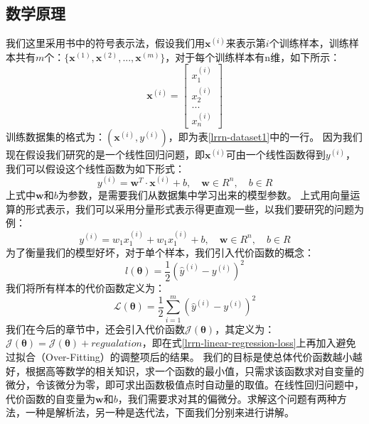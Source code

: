 \documentclass[UTF8]{article}
\begin{document}
\subsection{数学原理}
我们这里采用\cite{dl-tf-theano}书中的符号表示法，假设我们用$\boldsymbol{x}^{(i)}$来表示第$i$个训练样本，训练样本共有$m$个：$\{ \boldsymbol{x}^{(1)}, \boldsymbol{x}^{(2)}, ..., \boldsymbol{x}^{(m)} \}$，对于每个训练样本有n维，如下所示：
\begin{equation}
\boldsymbol{x}^{(i)} = \begin{bmatrix}
x_{1}^{(i)} \\
x_{2}^{(i)} \\
... \\
x_{n}^{(i)}
\end{bmatrix}
\label{lrrn-x-def}
\end{equation}
训练数据集的格式为：$(\boldsymbol{x}^{(i)}, y^{(i)})$，即为表\ref{lrrn-dataset1}中的一行。\newline
因为我们现在假设我们研究的是一个线性回归问题，即$\boldsymbol{x}^{(i)}$可由一个线性函数得到$y^{(i)}$，我们可以假设这个线性函数为如下形式：
\begin{equation}
y^{(i)} = \boldsymbol{w}^{T} \cdot \boldsymbol{x}^{(i)} + b, \quad \boldsymbol{w} \in R^{n}, \quad b \in R
\label{lrrn-linear-function-def}
\end{equation}
上式中$\boldsymbol{w}$和$b$为参数，是需要我们从数据集中学习出来的模型参数。\newline
上式用向量运算的形式表示，我们可以采用分量形式表示得更直观一些，以我们要研究的问题为例：
\begin{equation}
y^{(i)} = w_{1}x_{1}^{(i)} + w_{1}x_{1}^{(i)} + b, \quad \boldsymbol{w} \in R^{n}, \quad b \in R
\label{lrrn-linear-function-expand}
\end{equation}
为了衡量我们的模型好坏，对于单个样本，我们引入代价函数的概念：
\begin{equation}
l(\boldsymbol{\theta}) = \frac{1}{2} (\hat{y}^{(i)} - y^{(i)})^{2}
\label{lrrn-linear-regression-loss-i}
\end{equation}
我们将所有样本的代价函数定义为：
\begin{equation}
\mathcal{L}(\boldsymbol{\theta}) = \frac{1}{2} \sum_{i=1}^{m} (\hat{y}^{(i)} - y^{(i)})^{2}
\label{lrrn-linear-regression-loss}
\end{equation}
我们在今后的章节中，还会引入代价函数$\mathcal{J}(\boldsymbol{\theta})$，其定义为：$\mathcal{J}(\boldsymbol{\theta}) = \mathcal{J}(\boldsymbol{\theta}) + regualation$，即在式\ref{lrrn-linear-regression-loss}上再加入避免过拟合（Over-Fitting）的调整项后的结果。\newline
我们的目标是使总体代价函数越小越好，根据高等数学的相关知识，求一个函数的最小值，只需求该函数求对自变量的微分，令该微分为零，即可求出函数极值点时自动量的取值。在线性回归问题中，代价函数的自变量为$\boldsymbol{w}$和$b$，我们需要求对其的偏微分。求解这个问题有两种方法，一种是解析法，另一种是迭代法，下面我们分别来进行讲解。\newline
\end{document}
